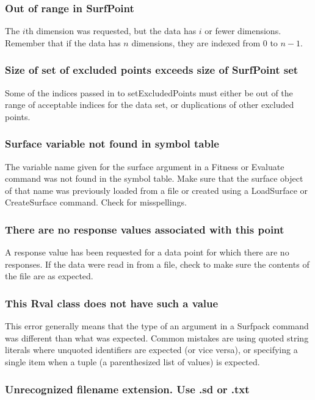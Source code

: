 \documentclass{article}
\begin{document}
\subsubsection{Out of range in SurfPoint}
The $i$th dimension was requested, but the data has $i$ or fewer dimensions.  Remember that if the data has $n$ dimensions, they are indexed from 0 to $n-1$.

\subsubsection{Size of set of excluded points exceeds size of SurfPoint set}
Some of the indices passed in to setExcludedPoints must either be out of the range of acceptable indices for the data set, or duplications of other excluded points.

\subsubsection{Surface variable not found in symbol table}
The variable name given for the surface argument in a Fitness or Evaluate command was not found in the symbol table.  Make sure that the surface object of that name was previously loaded from a file or created using a LoadSurface or CreateSurface command.  Check for misspellings.
\subsubsection{There are no response values associated with this point}
A response value has been requested for a data point for which there are no responses.  If the data were read in from a file, check to make sure the contents of the file are as expected.

\subsubsection{This Rval class does not have such a value}
This error generally means that the type of an argument in a Surfpack command was different than what was expected.  Common mistakes are using quoted string literals where unquoted identifiers are expected (or vice versa), or specifying a single item when a tuple (a parenthesized list of values) is expected.

\subsubsection{Unrecognized filename extension.  Use .sd or .txt}
\end{document}
